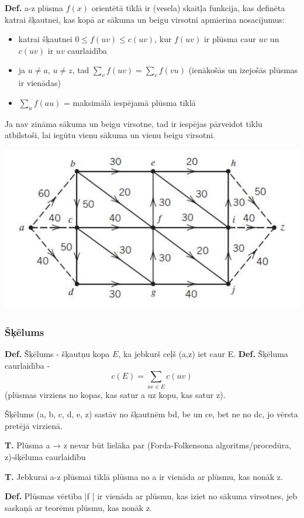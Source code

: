 \documentclass{article}
\begin{document}
\textbf{Def.} a-z plūsma $f(x)$ orientētā tīklā ir (vesela) skaitļa funkcija, kas definēta katrai šķautnei, kas kopā ar sākuma un beigu virsotni apmierina nosacījumus:
\begin{itemize}
	\item katrai šķautnei $0 \le f(uv) \le c(uv) $, kur $f(uv)$ ir plūsma caur $uv$ un $c(uv)$ ir $uv$ caurlaidība
	\item ja $u \ne a$, $u \ne z$, tad $\sum_{v}{f(uv)} = \sum_{v}{f(vu)}$ (ienākošās un izejošās plūsmas ir vienādas)
	\item $\sum_{u}{f(au)}$ = maksimālā iespējamā plūsma tīklā
\end{itemize}


Ja nav zināma sākuma un beigu virsotne, tad ir iespējas pārveidot tīklu atbilstoši, lai iegūtu vienu sākuma un vienu beigu virsotni.

\begin{center}
\includegraphics[width=0.5\linewidth]{network_extension-1}
\end{center}

\subsubsection{Šķēlums}
\textbf{Def.}  Šķēlums - šķautņu kopa $E$, ka jebkurš ceļš (a,z) iet caur E.
\textbf{Def.} Šķēluma caurlaidība - \begin{equation}c(E ) = \sum_{uv \in E}{c(uv)}\end{equation} (plūsmas virziens no kopas, kas satur a uz kopu, kas satur z).

Šķēlums ({a, b, c}, {d, e, z}) sastāv no šķautnēm bd, be un ce, bet ne no dc, jo vērsta pretējā virzienā.

\textbf{T. } Plūsma a → z nevar būt lielāka par (Forda-Folkensona algoritms/procedūra, z)-šķēluma caurlaidību

\textbf{T. } Jebkurai a-z plūsmai tīklā plūsma no a ir vienāda ar plūsmu, kas nonāk z.

\textbf{Def.} Plūsmas vērtība |f | ir vienāda ar plūsmu, kas iziet no sākuma virsotnes, jeb saskaņā ar teorēmu plūsmu, kas nonāk z.
\end{document}
